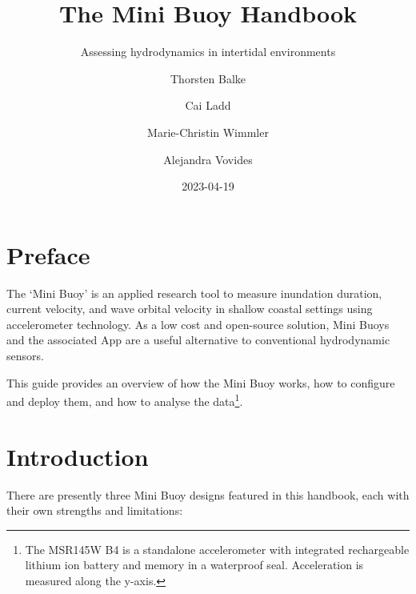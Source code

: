 \documentclass[
  letterpaper,
  DIV=11,
  numbers=noendperiod]{scrreprt}
\title{The Mini Buoy Handbook}
\subtitle{Assessing hydrodynamics in intertidal environments}
\author{Thorsten Balke \and Cai Ladd \and Marie-Christin
Wimmler \and Alejandra Vovides}
\date{2023-04-19}
\renewcommand*\contentsname{Table of contents}
\newcommand\contentsname{Table of contents}
\begin{document}
\maketitle
\ifdefined\Shaded\renewenvironment{Shaded}{\begin{tcolorbox}[sharp corners, interior hidden, frame hidden, enhanced, borderline west={3pt}{0pt}{shadecolor}, boxrule=0pt, breakable]}{\end{tcolorbox}}\fi

\renewcommand*\contentsname{Table of contents}
{
\hypersetup{linkcolor=}
\setcounter{tocdepth}{2}
\tableofcontents
}

\hypertarget{preface}{%
\chapter*{Preface}\label{preface}}


The `Mini Buoy' is an applied research tool to measure inundation
duration, current velocity, and wave orbital velocity in shallow coastal
settings using accelerometer technology. As a low cost and open-source
solution, Mini Buoys and the associated App are a useful alternative to
conventional hydrodynamic sensors.

This guide provides an overview of how the Mini Buoy works, how to
configure and deploy them, and how to analyse the data\footnote{The
  MSR145W B4 is a standalone accelerometer with integrated rechargeable
  lithium ion battery and memory in a waterproof seal. Acceleration is
  measured along the y-axis.}.


\hypertarget{sec-intro}{%
\chapter{Introduction}\label{sec-intro}}

There are presently three Mini Buoy designs featured in this handbook,
each with their own strengths and limitations:
\end{document}
